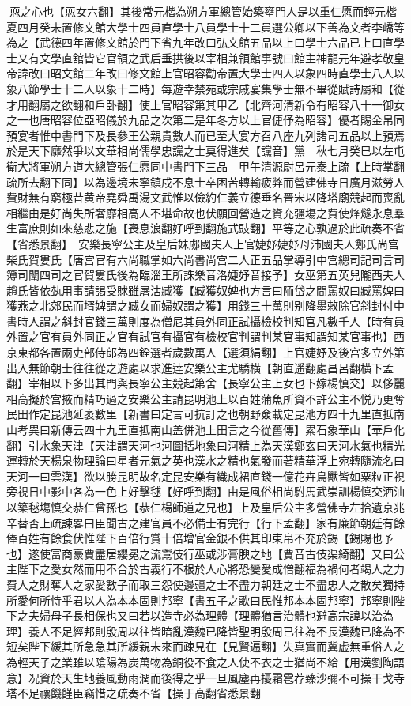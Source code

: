 恧之心也【恧女六翻】其後常元楷為朔方軍總管始築壅門人是以重仁愿而輕元楷　夏四月癸未置修文館大學士四員直學士八員學士十二員選公卿以下善為文者李嶠等為之【武德四年置修文館於門下省九年改曰弘文館五品以上曰學士六品已上曰直學士又有文學直舘皆它官領之武后垂拱後以宰相兼領館事號曰館主神龍元年避孝敬皇帝諱改曰昭文館二年改曰修文館上官昭容勸帝置大學士四人以象四時直學士八人以象八節學士十二人以象十二時】每遊幸禁苑或宗戚宴集學士無不畢從賦詩屬和【從才用翻屬之欲翻和戶卧翻】使上官昭容第其甲乙【北齊河清新令有昭容八十一御女之一也唐昭容位亞昭儀於九品之次第二是年冬方以上官倢伃為昭容】優者賜金帛同預宴者惟中書門下及長參王公親貴數人而已至大宴方召八座九列諸司五品以上預焉於是天下靡然爭以文華相尚儒學忠讜之士莫得進矣【讜音】黨　秋七月癸巳以左屯衛大將軍朔方道大總管張仁愿同中書門下三品　甲午清源尉呂元泰上疏【上時掌翻疏所去翻下同】以為邊境未寧鎮戍不息士卒困苦轉輸疲弊而營建佛寺日廣月滋勞人費財無有窮極昔黄帝堯舜禹湯文武惟以儉約仁義立德垂名晉宋以降塔廟競起而喪亂相繼由是好尚失所奢靡相高人不堪命故也伏願回營造之資充疆塲之費使烽燧永息羣生富庶則如來慈悲之施【喪息浪翻好呼到翻施式豉翻】平等之心孰過於此疏奏不省【省悉景翻】　安樂長寧公主及皇后妹郕國夫人上官婕妤婕妤母沛國夫人鄭氏尚宫柴氏賀婁氏【唐宫官有六尚職掌如六尚書尚宫二人正五品掌導引中宫總司記司言司簿司闈四司之官賀婁氏後為臨淄王所誅樂音洛婕妤音接予】女巫第五英兒隴西夫人趙氏皆依埶用事請謁受賕雖屠沽臧獲【臧獲奴婢也方言曰陑岱之間罵奴曰臧罵婢曰獲燕之北郊民而壻婢謂之臧女而婦奴謂之獲】用錢三十萬則别降墨敕除官斜封付中書時人謂之斜封官錢三萬則度為僧尼其員外同正試攝檢校判知官凡數千人【時有員外置之官有員外同正之官有試官有攝官有檢校官判謂判某官事知謂知某官事也】西京東都各置兩吏部侍郎為四銓選者歲數萬人【選須絹翻】上官婕妤及後宫多立外第出入無節朝士往往從之遊處以求進逹安樂公主尤驕横【朝直遥翻處昌呂翻横下孟翻】宰相以下多出其門與長寧公主競起第舍【長寧公主上女也下嫁楊慎交】以侈麗相高擬於宫掖而精巧過之安樂公主請昆明池上以百姓蒲魚所資不許公主不悦乃更奪民田作定昆池延袤數里【新書曰定言可抗訂之也朝野僉載定昆池方四十九里直抵南山考異曰新傳云四十九里直抵南山盖併池上田言之今從舊傳】累石象華山【華戶化翻】引水象天津【天津謂天河也河圖括地象曰河精上為天漢鄭玄曰天河水氣也精光運轉於天楊泉物理論曰星者元氣之英也漢水之精也氣發而著精華浮上宛轉隨流名曰天河一曰雲漢】欲以勝昆明故名定昆安樂有織成裙直錢一億花卉鳥獸皆如粟粒正視旁視日中影中各為一色上好擊毬【好呼到翻】由是風俗相尚駙馬武崇訓楊慎交洒油以築毬塲慎交恭仁曾孫也【恭仁楊師道之兄也】上及皇后公主多營佛寺左拾遺京兆辛替否上疏諫畧曰臣聞古之建官員不必備士有完行【行下孟翻】家有廉節朝廷有餘俸百姓有餘食伏惟陛下百倍行賞十倍增官金銀不供其印束帛不充於錫【錫賜也予也】遂使富商豪賈盡居纓冕之流鬻伎行巫或涉膏腴之地【賈音古伎渠綺翻】又曰公主陛下之愛女然而用不合於古義行不根於人心將恐變愛成憎翻福為禍何者竭人之力費人之財奪人之家愛數子而取三怨使邊疆之士不盡力朝廷之士不盡忠人之散矣獨持所愛何所恃乎君以人為本本固則邦寧【書五子之歌曰民惟邦本本固邦寧】邦寧則陛下之夫婦母子長相保也又曰若以造寺必為理體【理體猶言治體也避高宗諱以治為理】養人不足經邦則殷周以往皆暗亂漢魏已降皆聖明殷周已往為不長漢魏已降為不短矣陛下緩其所急急其所緩親未來而疎見在【見賢遍翻】失真實而冀虚無重俗人之為輕天子之業雖以隂陽為炭萬物為銅役不食之人使不衣之士猶尚不給【用漢劉陶語意】况資於天生地養風動雨潤而後得之乎一旦風塵再擾霜雹荐臻沙彌不可操干戈寺塔不足禳饑饉臣竊惜之疏奏不省【操于高翻省悉景翻